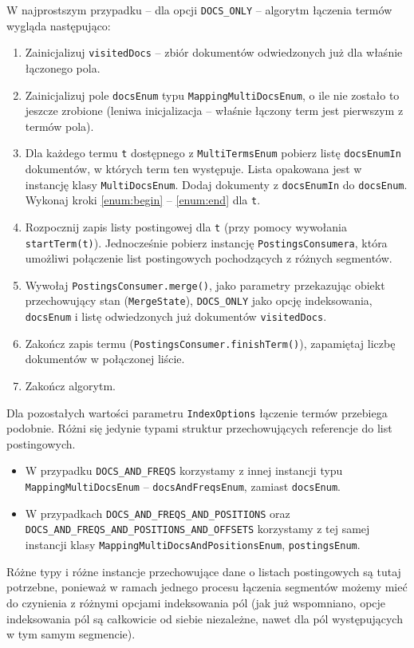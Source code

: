 W najprostszym przypadku -- dla opcji \texttt{DOCS\_ONLY} -- algorytm łączenia termów wygląda następująco:
\begin{enumerate}
 \item Zainicjalizuj \texttt{visitedDocs} -- zbiór dokumentów odwiedzonych już dla właśnie łączonego pola.
 \item Zainicjalizuj pole \texttt{docsEnum} typu \texttt{MappingMultiDocsEnum}, o ile nie zostało to jeszcze zrobione (leniwa inicjalizacja -- właśnie łączony term jest pierwszym z termów pola).
 \item Dla każdego termu \texttt{t} dostępnego z \texttt{MultiTermsEnum} pobierz listę \texttt{docsEnumIn} dokumentów, w których term ten występuje. Lista opakowana jest w instancję klasy \texttt{MultiDocsEnum}. Dodaj dokumenty z \texttt{docsEnumIn} do \texttt{docsEnum}. Wykonaj kroki \ref{enum:begin} -- \ref{enum:end} dla \texttt{t}.
 \item \label{enum:begin} Rozpocznij zapis listy postingowej dla \texttt{t} (przy pomocy wywołania \texttt{startTerm(t)}). Jednocześnie pobierz instancję \texttt{PostingsConsumera}, która umożliwi połączenie list postingowych pochodzących z różnych segmentów.
 \item \label{alg:postingsConsumerMergeCall} Wywołaj \texttt{PostingsConsumer.merge()}, jako parametry przekazując obiekt przechowujący stan (\texttt{MergeState}), \texttt{DOCS\_ONLY} jako opcję indeksowania, \texttt{docsEnum} i listę odwiedzonych już dokumentów \texttt{visitedDocs}.
 \item \label{enum:end} Zakończ zapis termu (\texttt{PostingsConsumer.finishTerm()}), zapamiętaj liczbę dokumentów w połączonej liście.
 \item Zakończ algorytm.
\end{enumerate}

Dla pozostałych wartości parametru \texttt{IndexOptions} łączenie termów przebiega podobnie. Różni się jedynie typami struktur przechowujących referencje do list postingowych.
\begin{itemize}
 \item W przypadku \texttt{DOCS\_AND\_FREQS} korzystamy z innej instancji typu \\ \texttt{MappingMultiDocsEnum} -- \texttt{docsAndFreqsEnum}, zamiast \texttt{docsEnum}.
 \item W przypadkach \texttt{DOCS\_AND\_FREQS\_AND\_POSITIONS} oraz \\ \texttt{DOCS\_AND\_FREQS\_AND\_POSITIONS\_AND\_OFFSETS} korzystamy z tej samej instancji klasy \texttt{MappingMultiDocsAndPositionsEnum}, \texttt{postingsEnum}.
\end{itemize}
Różne typy i różne instancje przechowujące dane o listach postingowych są tutaj potrzebne, ponieważ w ramach jednego procesu łączenia segmentów możemy mieć do czynienia z różnymi opcjami indeksowania pól (jak już wspomniano, opcje indeksowania pól są całkowicie od siebie niezależne, nawet dla pól występujących w tym samym segmencie).

